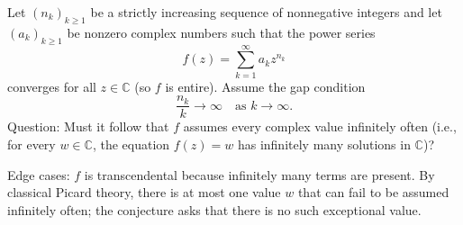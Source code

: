Let $(n_k)_{k\ge 1}$ be a strictly increasing sequence of nonnegative integers and let $(a_k)_{k\ge 1}$ be nonzero complex numbers such that the power series
\[
f(z)=\sum_{k=1}^{\infty} a_k z^{n_k}
\]
converges for all $z\in\mathbb{C}$ (so $f$ is entire). Assume the gap condition
\[
\frac{n_k}{k}\to\infty\quad\text{as }k\to\infty.
\]
Question: Must it follow that $f$ assumes every complex value infinitely often (i.e., for every $w\in\mathbb{C}$, the equation $f(z)=w$ has infinitely many solutions in $\mathbb{C}$)?

Edge cases: $f$ is transcendental because infinitely many terms are present. By classical Picard theory, there is at most one value $w$ that can fail to be assumed infinitely often; the conjecture asks that there is no such exceptional value.
